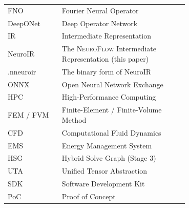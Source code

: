 \documentclass[10pt,twocolumn]{article}
\newcommand{\nf}{\textsc{NeuroFlow}}
\begin{document}
\begin{tabular}{lp{0.7\linewidth}}
FNO & Fourier Neural Operator~\cite{li2021fno}\\
DeepONet & Deep Operator Network~\cite{lu2021deeponet}\\
IR & Intermediate Representation\\
NeuroIR & The \nf{} Intermediate Representation (this paper)\\
.nneuroir & The binary form of NeuroIR\\
ONNX & Open Neural Network Exchange~\cite{bai2019onnx}\\
HPC & High-Performance Computing\\
FEM / FVM & Finite-Element / Finite-Volume Method\\
CFD & Computational Fluid Dynamics\\
EMS & Energy Management System\\
HSG & Hybrid Solve Graph (Stage 3)\\
UTA & Unified Tensor Abstraction\\
SDK & Software Development Kit\\
PoC & Proof of Concept\\
\end{tabular}
\end{document}
